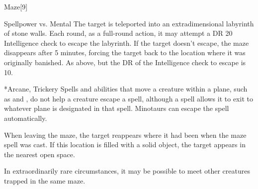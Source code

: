 \begin{spellsection}{Maze}[9]
    \begin{spellheader}
    \end{spellheader}
    \begin{spellcontent}
        \begin{spelltargetinginfo}
        \end{spelltargetinginfo}
        \begin{spelleffects}
            \begin{spellattack}{Spellpower vs. Mental}
                \spellsuccess The target is teleported into an extradimensional labyrinth of stone walls. Each round, as a full-round action, it may attempt a DR 20 Intelligence check to escape the labyrinth. If the target doesn't escape, the maze disappears after 5 minutes, forcing the target back to the location where it was originally banished.
                \spellfailure As above, but the DR of the Intelligence check to escape is 10.
            \end{spellattack}
        \end{spelleffects}
    \end{spellcontent}
    \begin{spellfooter}
        *{Arcane, Trickery}
        \spellnotes Spells and abilities that move a creature within a plane, such as  and , do not help a creature escape a  spell, although a  spell allows it to exit to whatever plane is designated in that spell. Minotaurs can escape the spell automatically.

        When leaving the maze, the target reappears where it had been when the maze spell was cast. If this location is filled with a solid object, the target appears in the nearest open space.

        In extraordinarily rare circumstances, it may be possible to meet other creatures trapped in the same maze.

        \norepeatspellnotes
        \miscastrandom
    \end{spellfooter}
\end{spellsection}


